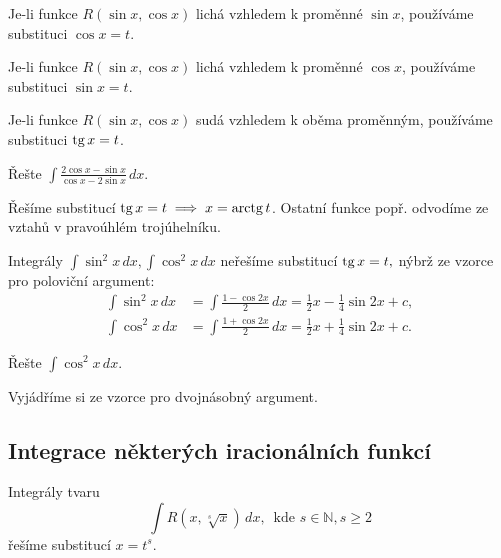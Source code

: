 \begin{veta}
    Je-li funkce $R(\sin x, \cos x)$ lichá vzhledem k
    proměnné $\sin x$, používáme substituci $\cos x=t$.
\end{veta}

\begin{veta}
    Je-li funkce $R(\sin x, \cos x)$ lichá vzhledem k
    proměnné $\cos x$, používáme substituci $\sin x=t$.
\end{veta}

\begin{veta}
    Je-li funkce $R(\sin x, \cos x)$ sudá vzhledem k
    oběma proměnným, používáme substituci $\operatorname{tg} x=t$.
\end{veta}

\begin{priklad}
Řešte $\int \frac{2\cos x - \sin x}{\cos x - 2\sin x}\, dx$.
\end{priklad}

\begin{reseni}
Řešíme substitucí $\operatorname{tg} x = t \implies x=\operatorname{arctg} t$. Ostatní funkce popř.
odvodíme ze vztahů v pravoúhlém trojúhelníku.
\end{reseni}

\begin{pozn}
    Integrály $\int \sin^2 x \, dx, \int \cos^2 x \, dx$ neřešíme substitucí
    $\operatorname{tg} x  = t,$ nýbrž ze vzorce pro poloviční argument:
    \begin{align*}
        \int \sin^2 x \, dx &= \int \frac{1-\cos 2x}{2}\, dx = \frac{1}{2}x - \frac{1}{4} \sin 2x + c, \\
        \int \cos^2 x \, dx &= \int \frac{1+\cos 2x}{2}\, dx = \frac{1}{2}x + \frac{1}{4} \sin 2x + c.
    \end{align*}
\end{pozn}

\begin{priklad}
Řešte $\int \cos^2 x \, dx$.
\end{priklad}

\begin{reseni}
Vyjádříme si ze vzorce pro dvojnásobný argument.
\end{reseni}

\subsection*{Integrace některých iracionálních funkcí}
\begin{veta}
    Integrály tvaru
    $$\int R(x,\sqrt[s]{x}) \, dx, \,\,\, \textrm{kde } s \in \mathbb N, s \geq 2$$
    řešíme substitucí $x=t^s$.
\end{veta}

